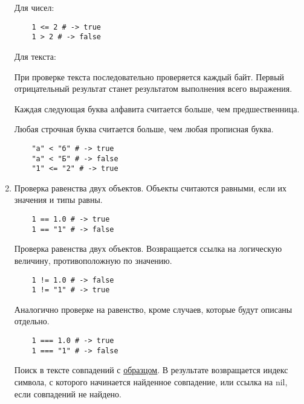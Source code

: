 \begin{enumerate}
\begin{operator}
    Для чисел:
    \begin{verbatim}
    1 <= 2 # -> true
    1 > 2 # -> false
    \end{verbatim}

    Для текста:

    При проверке текста последовательно проверяется каждый байт. Первый отрицательный результат станет результатом выполнения всего выражения.

    Каждая следующая буква алфавита считается больше, чем предшественница.

    Любая строчная буква считается больше, чем любая прописная буква.
    \begin{verbatim}
    "а" < "б" # -> true
    "а" < "Б" # -> false
    "1" <= "2" # -> true
    \end{verbatim}
  \end{operator}

  \item %
  \begin{operator}
    Проверка равенства двух объектов. Объекты считаются равными, если их значения и типы равны.
    \begin{verbatim}
    1 == 1.0 # -> true
    1 == "1" # -> false
    \end{verbatim}
  \end{operator}

  \begin{operator}
    Проверка равенства двух объектов. Возвращается ссылка на логическую величину, противоположную по значению.
    \begin{verbatim}
    1 != 1.0 # -> false
    1 != "1" # -> true
    \end{verbatim}
  \end{operator}

  \begin{operator}
    Аналогично проверке на равенство, кроме случаев, которые будут описаны отдельно.
    \begin{verbatim}
    1 === 1.0 # -> true
    1 === "1" # -> false
    \end{verbatim}
  \end{operator}

  \begin{operator}
    Поиск в тексте совпадений с \hyperlink{appregexp}{\underline{образцом}}. В результате возвращается индекс символа, с которого начинается найденное совпадение, или ссылка на nil, если совпадений не найдено.
  \end{operator}


\end{enumerate}
